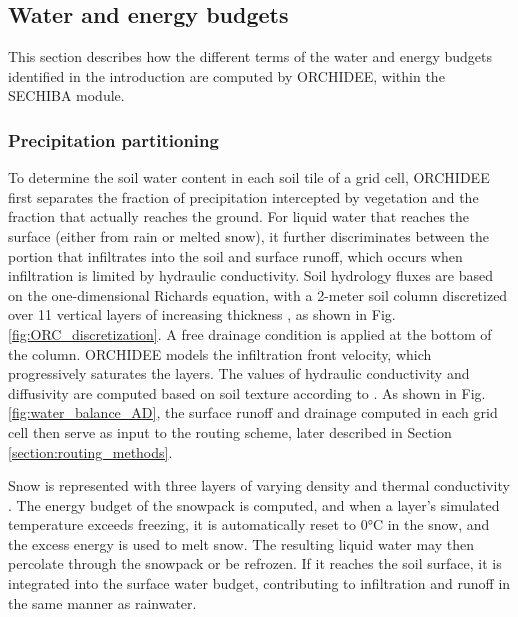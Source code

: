 \subsection{Water and energy budgets}\label{sec:water}

This section describes how the different terms of the water and energy budgets identified in the introduction are computed by ORCHIDEE, within the SECHIBA module. 

\subsubsection*{Precipitation partitioning}

To determine the soil water content in each soil tile of a grid cell, ORCHIDEE first separates the fraction of precipitation intercepted by vegetation and the fraction that actually reaches the ground. 
For liquid water that reaches the surface (either from rain or melted snow), it further discriminates between the portion that infiltrates into the soil and surface runoff, which occurs when infiltration is limited by hydraulic conductivity. Soil hydrology fluxes are based on the one-dimensional Richards equation, with a 2-meter soil column discretized over 11 vertical layers of increasing thickness \citep{de_rosnay_impact_2002, dorgeval_sensitivity_2008}, as shown in Fig. \ref{fig:ORC_discretization}. A free drainage condition is applied at the bottom of the column. ORCHIDEE models the infiltration front velocity, which progressively saturates the layers. The values of hydraulic conductivity and diffusivity are computed based on soil texture according to \citet{mualem_new_1976, van_genuchten_closed-form_1980}. As shown in Fig. \ref{fig:water_balance_AD}, the surface runoff and drainage computed in each grid cell then serve as input to the routing scheme, later described in Section \ref{section:routing_methods}.

Snow is represented with three layers of varying density and thermal conductivity \citep{wang_evaluation_2013}. The energy budget of the snowpack is computed, and when a layer's simulated temperature exceeds freezing, it is automatically reset to 0°C in the snow, and the excess energy is used to melt snow. The resulting liquid water may then percolate through the snowpack or be refrozen. If it reaches the soil surface, it is integrated into the surface water budget, contributing to infiltration and runoff in the same manner as rainwater.

